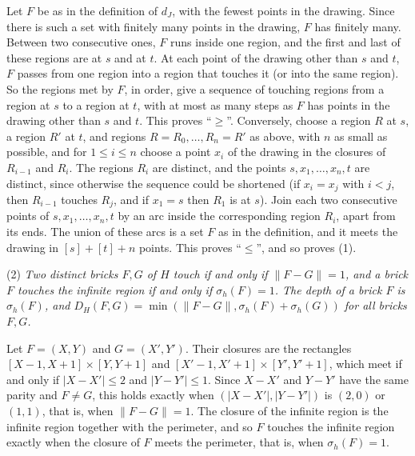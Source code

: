 {Let $F$ be as in the definition of $d_J$, with the fewest points in the drawing. Since there is such a set with finitely many points in the drawing, $F$ has finitely many. Between two consecutive ones, $F$ runs inside one region, and the first and last of these regions are at $s$ and at $t$. At each point of the drawing other than $s$ and $t$, $F$ passes from one region into a region that touches it (or into the same region). So the regions met by $F$, in order, give a sequence of touching regions from a region at $s$ to a region at $t$, with at most as many steps as $F$ has points in the drawing other than $s$ and $t$. This proves ``$\ge$''. Conversely, choose a region $R$ at $s$, a region $R'$ at $t$, and regions $R = R_0, \dots, R_n = R'$ as above, with $n$ as small as possible, and for $1 \le i \le n$ choose a point $x_i$ of the drawing in the closures of $R_{i-1}$ and $R_i$. The regions $R_i$ are distinct, and the points $s, x_1, \dots, x_n, t$ are distinct, since otherwise the sequence could be shortened (if $x_i = x_j$ with $i < j$, then $R_{i-1}$ touches $R_j$, and if $x_1 = s$ then $R_1$ is at $s$). Join each two consecutive points of $s, x_1, \dots, x_n, t$ by an arc inside the corresponding region $R_i$, apart from its ends. The union of these arcs is a set $F$ as in the definition, and it meets the drawing in $[s] + [t] + n$ points. This proves ``$\le$'', and so proves (1).

\hspace*{12pt}(2) \textit{Two distinct bricks $F, G$ of $H$ touch if and only if $\|F - G\| = 1$, and a brick $F$ touches the infinite region if and only if $\sigma_h(F) = 1$. The depth of a brick $F$ is $\sigma_h(F)$, and $D_H(F, G) = \min(\|F - G\|, \sigma_h(F) + \sigma_h(G))$ for all bricks $F, G$.}

Let $F = (X, Y)$ and $G = (X', Y')$. Their closures are the rectangles $[X - 1, X + 1] \times [Y, Y + 1]$ and $[X' - 1, X' + 1] \times [Y', Y' + 1]$, which meet if and only if $|X - X'| \le 2$ and $|Y - Y'| \le 1$. Since $X - X'$ and $Y - Y'$ have the same parity and $F \ne G$, this holds exactly when $(|X - X'|, |Y - Y'|)$ is $(2, 0)$ or $(1, 1)$, that is, when $\|F - G\| = 1$. The closure of the infinite region is the infinite region together with the perimeter, and so $F$ touches the infinite region exactly when the closure of $F$ meets the perimeter, that is, when $\sigma_h(F) = 1$.

}

